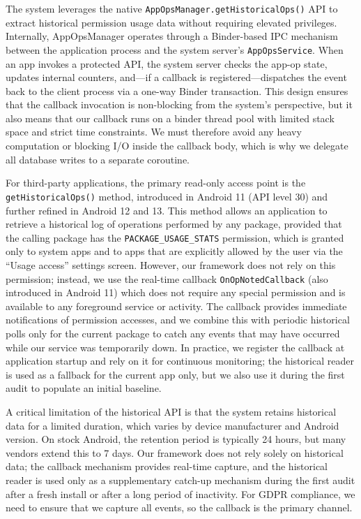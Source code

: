 The system leverages the native \texttt{AppOpsManager.getHistoricalOps()} API to extract historical permission usage data without requiring elevated privileges. Internally, AppOpsManager operates through a Binder-based IPC mechanism between the application process and the system server's \texttt{AppOpsService}. When an app invokes a protected API, the system server checks the app-op state, updates internal counters, and—if a callback is registered—dispatches the event back to the client process via a one-way Binder transaction. This design ensures that the callback invocation is non-blocking from the system's perspective, but it also means that our callback runs on a binder thread pool with limited stack space and strict time constraints. We must therefore avoid any heavy computation or blocking I/O inside the callback body, which is why we delegate all database writes to a separate coroutine.

For third-party applications, the primary read-only access point is the \texttt{getHistoricalOps()} method, introduced in Android 11 (API level 30) and further refined in Android 12 and 13. This method allows an application to retrieve a historical log of operations performed by any package, provided that the calling package has the \texttt{PACKAGE\_USAGE\_STATS} permission, which is granted only to system apps and to apps that are explicitly allowed by the user via the ``Usage access'' settings screen. However, our framework does not rely on this permission; instead, we use the real-time callback \texttt{OnOpNotedCallback} (also introduced in Android 11) which does not require any special permission and is available to any foreground service or activity. The callback provides immediate notifications of permission accesses, and we combine this with periodic historical polls only for the current package to catch any events that may have occurred while our service was temporarily down. In practice, we register the callback at application startup and rely on it for continuous monitoring; the historical reader is used as a fallback for the current app only, but we also use it during the first audit to populate an initial baseline.

A critical limitation of the historical API is that the system retains historical data for a limited duration, which varies by device manufacturer and Android version. On stock Android, the retention period is typically 24 hours, but many vendors extend this to 7 days. Our framework does not rely solely on historical data; the callback mechanism provides real-time capture, and the historical reader is used only as a supplementary catch-up mechanism during the first audit after a fresh install or after a long period of inactivity. For GDPR compliance, we need to ensure that we capture all events, so the callback is the primary channel.

